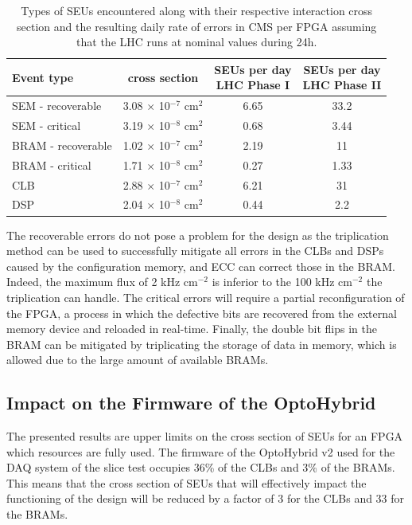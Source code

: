       \begin{table}[h!]
        \begin{tabularx}{\textwidth}{L{1.1}C{1}C{0.95}C{0.95}}
          \textbf{Event type} & \textbf{cross section} & \textbf{SEUs per day \newline LHC Phase I} & \textbf{SEUs per day \newline LHC Phase II} \\ \hline
          SEM - recoverable & 3.08 $ \times $ 10$^{-7}$ cm$^2$ &  6.65  & 33.2  \\
          SEM - critical & 3.19 $ \times $ 10$^{-8}$ cm$^2$ & 0.68  & 3.44  \\
          BRAM - recoverable & 1.02 $ \times $ 10$^{-7}$ cm$^2$ & 2.19  & 11  \\
          BRAM - critical & 1.71 $ \times $ 10$^{-8}$ cm$^2$ & 0.27  & 1.33  \\
          CLB & 2.88 $ \times $ 10$^{-7}$ cm$^2$ & 6.21  & 31  \\
          DSP & 2.04 $ \times $ 10$^{-8}$ cm$^2$ & 0.44  & 2.2 \\
        \end{tabularx}
        \caption{Types of SEUs encountered along with their respective interaction cross section and the resulting daily rate of errors in CMS per FPGA assuming that the LHC runs at nominal values during 24h.}
        \label{tab:II-5-seu-rate}
      \end{table}

      The recoverable errors do not pose a problem for the design as the triplication method can be used to successfully mitigate all errors in the CLBs and DSPs caused by the configuration memory, and ECC can correct those in the BRAM. Indeed, the maximum flux of 2 kHz cm$^{-2}$ is inferior to the 100 kHz cm$^{-2}$ the triplication can handle. The critical errors will require a partial reconfiguration of the FPGA, a process in which the defective bits are recovered from the external memory device and reloaded in real-time. Finally, the double bit flips in the BRAM can be mitigated by triplicating the storage of data in memory, which is allowed due to the large amount of available BRAMs.

    \subsection{Impact on the Firmware of the OptoHybrid}

      The presented results are upper limits on the cross section of SEUs for an FPGA which resources are fully used. The firmware of the OptoHybrid v2 used for the DAQ system of the slice test occupies 36\% of the CLBs and 3\% of the BRAMs. This means that the cross section of SEUs that will effectively impact the functioning of the design will be reduced by a factor of 3 for the CLBs and 33 for the BRAMs. \\

